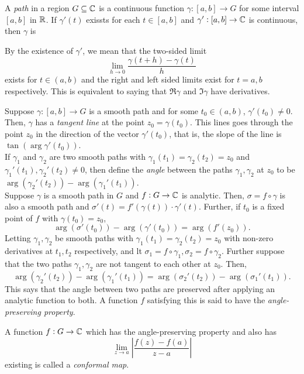 	\begin{fdef}
		A \emph{path} in a region $G \subseteq \mathbb{C}$ is a continuous function $\gamma:[a,b]\to G$ for some interval $[a,b]$ in $\mathbb{R}$. If $\gamma'(t)$ exissts for each $t \in [a,b]$ and $\gamma':[a,b]\to\mathbb{C}$ is continuous, then $\gamma$ is
	\end{fdef}

	By the existence of $\gamma'$, we mean that the two-sided limit
	\[ \lim_{h\to 0} \frac{\gamma(t+h)-\gamma(t)}{h} \]
	exists for $t \in (a,b)$ and the right and left sided limits exist for $t = a,b$ respectively. This is equivalent to saying that $\Re \gamma$ and $\Im \gamma$ have derivatives.

	Suppose $\gamma : [a,b] \to G$ is a smooth path and for some $t_0 \in (a,b)$, $\gamma'(t_0) \ne 0$. Then, $\gamma$ has a \emph{tangent line} at the point $z_0 = \gamma(t_0)$. This lines goes through the point $z_0$ in the direction of the vector $\gamma'(t_0)$, that is, the slope of the line is $\tan(\arg \gamma'(t_0))$.\\

	If $\gamma_1$ and $\gamma_2$ are two smooth paths with $\gamma_1(t_1) = \gamma_2(t_2) = z_0$ and $\gamma_1'(t_1),\gamma_2'(t_2) \ne 0$, then define the \emph{angle} between the paths $\gamma_1,\gamma_2$ at $z_0$ to be $\arg(\gamma_2'(t_2)) - \arg(\gamma_1'(t_1))$.\\

	Suppose $\gamma$ is a smooth path in $G$ and $f:G\to\mathbb{C}$ is analytic. Then, $\sigma = f \circ \gamma$ is also a smooth path and $\sigma'(t) = f'(\gamma(t)) \cdot \gamma'(t)$. Further, if $t_0$ is a fixed point of $f$ with $\gamma(t_0) = z_0$,
	\[ \arg(\sigma'(t_0)) - \arg(\gamma'(t_0)) = \arg(f'(z_0)). \]
	Letting $\gamma_1,\gamma_2$ be smooth paths with $\gamma_1(t_1) = \gamma_2(t_2) = z_0$ with non-zero derivatives at $t_1,t_2$ respectively, and lt $\sigma_1 = f \circ \gamma_1, \sigma_2 = f \circ \gamma_2$. Further suppose that the two paths $\gamma_1,\gamma_2$ are not tangent to each other at $z_0$. Then,
	\[ \arg(\gamma_2'(t_2)) - \arg(\gamma_1'(t_1)) = \arg(\sigma_2'(t_2)) - \arg(\sigma_1'(t_1)). \]
	This says that the angle between two paths are preserved after applying an analytic function to both. A function $f$ satisfying this is said to have the \emph{angle-preserving property}.

	\begin{fdef}
		A function $f : G \to \mathbb{C}$ which has the angle-preserving property and also has 
		\[ \lim_{z\to a} \left|\frac{f(z)-f(a)}{z-a}\right| \]
		existing is called a \emph{conformal map}.
	\end{fdef}

